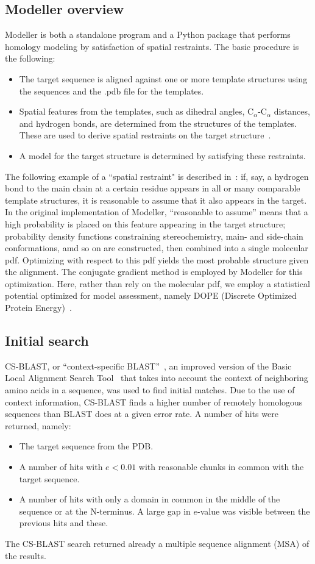 \documentclass[notitlepage]{report}   %
\begin{document}
\subsection*{Modeller overview}
Modeller is both a standalone program and a Python package that performs homology modeling by satisfaction of spatial restraints. The basic procedure is the following:
\begin{itemize}
\item The target sequence is aligned against one or more template structures using the sequences and the .pdb file for the templates.
\item Spatial features from the templates, such as dihedral angles, C$_\alpha$-C$_\alpha$ distances, and hydrogen bonds, are determined from the structures of the templates. These are used to derive spatial restraints on the target structure~\cite{sali1994comparative}.
\item A model for the target structure is determined by satisfying these restraints.
\end{itemize}
The following example of a ``spatial restraint" is described in~\cite{sali1994comparative}: if, say, a hydrogen bond to the main chain at a certain residue appears in all or many comparable template structures, it is reasonable to assume that it also appears in the target. In the original implementation of Modeller, ``reasonable to assume'' means that a high probability is placed on this feature appearing in the target structure; probability density functions constraining stereochemistry, main- and side-chain conformations, amd so on are constructed, then combined into a single molecular pdf. Optimizing with respect to this pdf yields the most probable structure given the alignment. The conjugate gradient method is employed by Modeller for this optimization. Here, rather than rely on the molecular pdf, we employ a statistical potential optimized for model assessment, namely DOPE (Discrete Optimized Protein Energy)~\cite{DOPE}.

\subsection*{Initial search}
CS-BLAST, or ``context-specific BLAST''~\cite{csblast}, an improved version of the Basic Local Alignment Search Tool~\cite{BLAST} that takes into account the context of neighboring amino acids in a sequence, was used to find initial matches. Due to the use of context information, CS-BLAST finds a higher number of remotely homologous sequences than BLAST does at a given error rate. A number of hits were returned, namely:
\begin{itemize}
\item The target sequence from the PDB.
\item A number of hits with $e < 0.01$ with reasonable chunks in common with the target sequence.
\item A number of hits with only a domain in common in the middle of the sequence or at the N-terminus. A large gap in $e$-value was visible between the previous hits and these.
\end{itemize}
The CS-BLAST search returned already a multiple sequence alignment (MSA) of the results.
\end{document}
